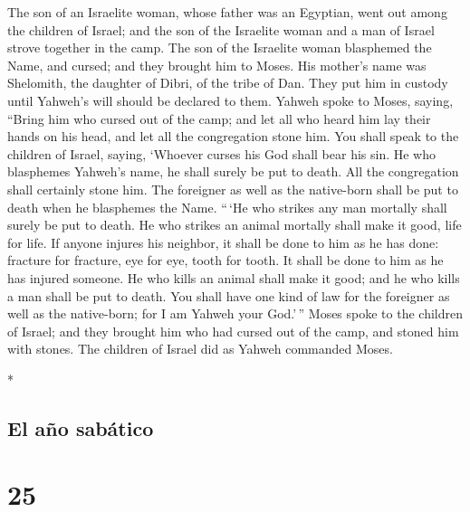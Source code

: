 \begin{paracol}{2}
\begin{otherlanguage}{english}
 The son of an Israelite woman, whose father was an
Egyptian, went out among the children of Israel; and the son of the
Israelite woman and a man of Israel strove together in the camp.
 The son of the Israelite woman blasphemed the Name, and
cursed; and they brought him to Moses. His mother's name was Shelomith,
the daughter of Dibri, of the tribe of Dan.  They put him
in custody until Yahweh's will should be declared to them.
 Yahweh spoke to Moses, saying,  ``Bring
him who cursed out of the camp; and let all who heard him lay their
hands on his head, and let all the congregation stone him.
 You shall speak to the children of Israel, saying,
`Whoever curses his God shall bear his sin.  He who
blasphemes Yahweh's name, he shall surely be put to death. All the
congregation shall certainly stone him. The foreigner as well as the
native-born shall be put to death when he blasphemes the Name.
 ``\,`He who strikes any man mortally shall surely be put
to death.  He who strikes an animal mortally shall make
it good, life for life.  If anyone injures his neighbor,
it shall be done to him as he has done:  fracture for
fracture, eye for eye, tooth for tooth. It shall be done to him as he
has injured someone.  He who kills an animal shall make
it good; and he who kills a man shall be put to death. 
You shall have one kind of law for the foreigner as well as the
native-born; for I am Yahweh your God.'\,''  Moses spoke
to the children of Israel; and they brought him who had cursed out of
the camp, and stoned him with stones. The children of Israel did as
Yahweh commanded Moses.

\end{otherlanguage}

\switchcolumn[0]*

\hypertarget{el-auxf1o-sabuxe1tico}{%
\subsection{El año sabático}\label{el-auxf1o-sabuxe1tico}}

\hypertarget{section-48}{%
\section{25}\label{section-48}}


\end{paracol}
